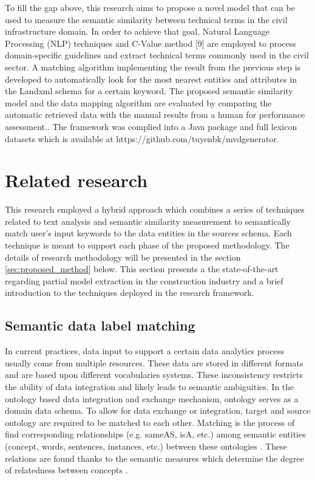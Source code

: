 \documentclass[Journal, InsideFigs, DoubleSpace]{ascelike} %
\begin{document}
To fill the gap above, this research aims to propose a novel model that can be used to measure the semantic similarity between technical terms in the civil infrastructure domain. In order to achieve that goal, Natural Language Processing (NLP) techniques and C-Value method [9] are employed to process domain-specific guidelines and extract technical terms commonly used in the civil sector. A matching algorithm implementing the result from the previous step is developed to automatically look for the most nearest entities and attributes in the Landxml schema for a certain keyword. The proposed semantic similarity model and the data mapping algorithm are evaluated by comparing the automatic retrieved data with the manual results from a human for performance assessment.. The framework was complied into a Java package and full lexicon datasets which is available at https://github.com/tuyenbk/mvdgenerator.
%
\section{Related research} \label{sec:litrev} %
This research employed a hybrid approach which combines a series of techniques related to text analysis and semantic similarity measurement to semantically match user's input keywords to the data entities in the sources schema. Each technique is meant to support each phase of the proposed methodology. The details of research methodology will be presented in the section \ref{sec:proposed_method} below. This section presents a the state-of-the-art regarding partial model extraction in the construction industry and a brief introduction to the techniques deployed in the research framework.


\subsection{Semantic data label matching}

In current practices, data input to support a certain data analytics process usually come from multiple resources. These data are stored in different formats and are based upon different vocabularies systems. These inconsistency restricts the ability of data integration and likely leads to semantic ambiguities. In the ontology based data integration and exchange mechanism, ontology serves as a domain data schema. To allow for data exchange or integration, target and source ontology are required to  be matched to each other. Matching is the process of find corresponding relationships (e.g. sameAS, isA, etc.) among semantic entities (concept, words, sentences, instances, etc.) between these ontologies \cite{harispe15}. These relations are found thanks to the semantic measures which determine the degree of relatedness between concepts \cite{harispe15}. 
\end{document}
